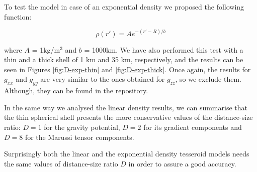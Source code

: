 \documentclass[extra]{gji}
\begin{document}
To test the model in case of an exponential density we proposed the following function:

\begin{equation}
    \rho(r') = A e^{-(r' - R)/b}
\label{eq:density-exp}
\end{equation}

\noindent where $A$ = 1kg/m$^3$ and $b$ = 1000km.
We have also performed this test with a thin and a thick shell of 1 km and 35 km, respectively, and the results can be seen in Figures \ref{fig:D-exp-thin} and \ref{fig:D-exp-thick}.
Once again, the results for $g_{xx}$ and $g_{yy}$ are very similar to the ones obtained for $g_{zz}$, so we exclude them. Although, they can be found in the repository.

In the same way we analysed the linear density results, we can summarise that the thin spherical shell presents the more conservative values of the distance-size ratio: $D=1$ for the gravity potential, $D=2$ for its gradient components and $D=8$ for the Marussi tensor components.

Surprisingly both the linear and the exponential density tesseroid models needs the same values of distance-size ratio $D$ in order to assure a good accuracy.
\end{document}
